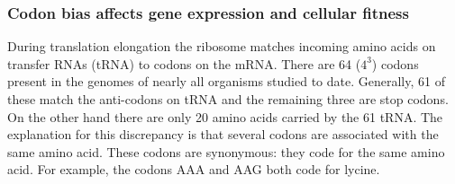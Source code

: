 

\subsubsection{Codon bias affects gene expression and cellular fitness}
During translation elongation the ribosome matches incoming amino acids on
transfer RNAs (tRNA) to codons on the mRNA. There are 64 ($4^3$) codons present
in the genomes of nearly all organisms studied to date. Generally, 61 of these
match the anti-codons on tRNA and the remaining three are stop codons. On the
other hand there are only 20 amino acids carried by the 61 tRNA. The
explanation for this discrepancy is that several codons are associated with the
same amino acid. These codons are synonymous: they code for the same amino
acid. For example, the codons AAA and AAG both code for lycine.

